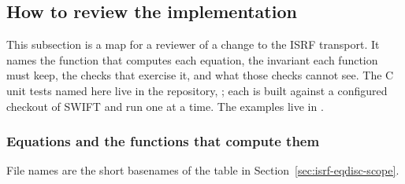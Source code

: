 \subsection{How to review the implementation}
\label{sec:isrf-review}

This subsection is a map for a reviewer of a change to the ISRF transport.
It names the function that computes each equation, the invariant each
function must keep, the checks that exercise it, and what those checks
cannot see. The C unit tests named here live in the 
repository, ; each is built against a configured
checkout of SWIFT and run one at a time. The examples live in
.

\subsubsection{Equations and the functions that compute them}

File names are the short basenames of the table in
Section~\ref{sec:isrf-eqdisc-scope}.

